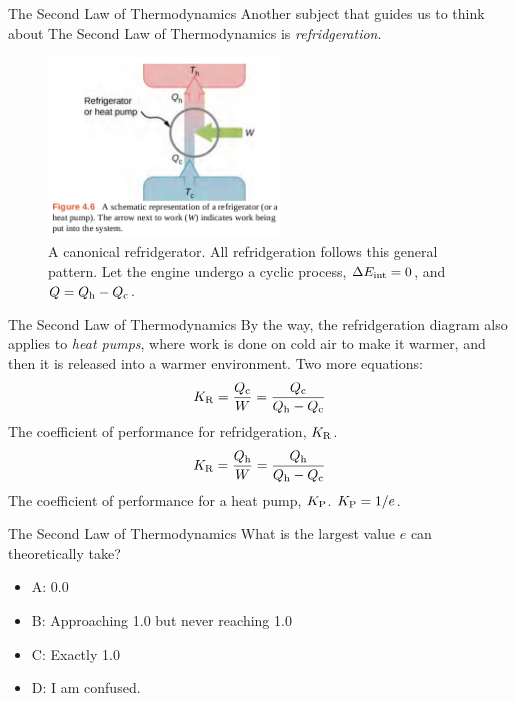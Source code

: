 \documentclass{beamer}
\begin{document}
\begin{frame}{The Second Law of Thermodynamics}
Another subject that guides us to think about The Second Law of Thermodynamics is \textit{refridgeration}.
\begin{figure}
\centering
\includegraphics[width=0.55\textwidth]{figures/fridge.png}
\caption{\label{fig:fridge} A canonical refridgerator.  All refridgeration follows this general pattern.  Let the engine undergo a cyclic process, $\Delta E_{\rm int} = 0$, and $Q = Q_{\rm h} - Q_{\rm c}$.}
\end{figure}
\end{frame}

\begin{frame}{The Second Law of Thermodynamics}
By the way, the refridgeration diagram also applies to \textit{heat pumps}, where work is done on cold air to make it warmer, and then it is released into a warmer environment.  Two more equations:
\begin{equation}
K_{\rm R} = \frac{Q_{\rm c}}{W} = \frac{Q_{\rm c}}{Q_{\rm h}-Q_{\rm c}}
\end{equation}
The coefficient of performance for refridgeration, $K_{\rm R}$.
\begin{equation}
K_{\rm R} = \frac{Q_{\rm h}}{W} = \frac{Q_{\rm h}}{Q_{\rm h}-Q_{\rm c}}
\end{equation}
The coefficient of performance for a heat pump, $K_{\rm P}$.  $K_{\rm P} = 1/e$.
\end{frame}

\begin{frame}{The Second Law of Thermodynamics}
What is the largest value $e$ can theoretically take?
\begin{itemize}
\item A: 0.0
\item B: Approaching 1.0 but never reaching 1.0
\item C: Exactly 1.0
\item D: I am confused.
\end{itemize}
\end{frame}
\end{document}
